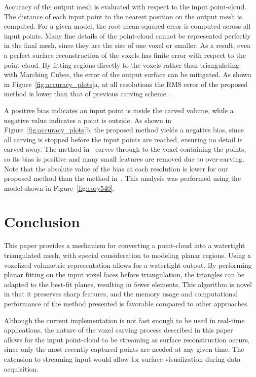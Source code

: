 \documentclass[10pt,twocolumn,letterpaper]{article}
\begin{document}
Accuracy of the output mesh is evaluated with respect to the input point-cloud.  The distance of each input point to the nearest position on the output mesh is computed.  For a given model, the root-mean-squared error is computed across all input points. Many fine details of the point-cloud cannot be represented perfectly in the final mesh, since they are the size of one voxel or smaller.  As a result, even a perfect surface reconstruction of the voxels has finite error with respect to the point-cloud.  By fitting regions directly to the voxels rather than triangulating with Marching Cubes, the error of the output surface can be mitigated.  As shown in Figure~\ref{fig:accuracy_plots}a, at all resolutions the RMS error of the proposed method is lower than that of previous carving scheme~\cite{Carving}.

A positive bias indicates an input point is inside the carved volume, while a negative value indicates a point is outside. As shown in Figure~\ref{fig:accuracy_plots}b, the proposed method yields a negative bias, since all carving is stopped before the input points are reached, ensuring no detail is carved away.  The method in~\cite{Carving} carves through to the voxel containing the points, so its bias is positive and many small features are removed due to over-carving.  Note that the absolute value of the bias at each resolution is lower for our proposed method than the method in~\cite{Carving}.  This analysis was performed using the model shown in Figure~\ref{fig:cory540}.

\section{Conclusion}
\label{sec:conclusion}


This paper provides a mechanism for converting a point-cloud into a watertight triangulated mesh, with special consideration to modeling planar regions.  Using a voxelized volumetric representation allows for a watertight output.  By performing planar fitting on the input voxel faces before triangulation, the triangles can be adapted to the best-fit planes, resulting in fewer elements.  This algorithm is novel in that it preserves sharp features, and the memory usage and computational performance of the method presented is favorable compared to other approaches.

Although the current implementation is not fast enough to be used in real-time applications, the nature of the voxel carving process described in this paper allows for the input point-cloud to be streaming as surface reconstruction occurs, since only the most recently captured points are needed at any given time.  The extension to streaming input would allow for surface visualization during data acquisition.


{\small


}
\end{document}
